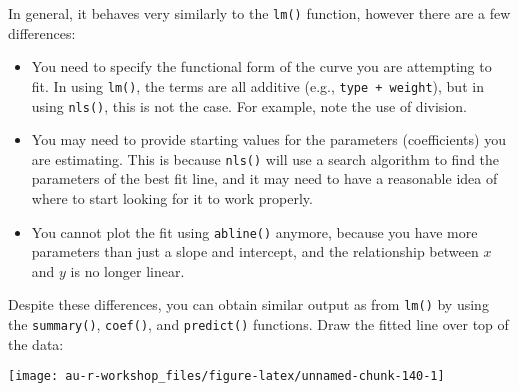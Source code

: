 \documentclass[]{book}
\newenvironment{Shaded}{\begin{snugshade}}{\end{snugshade}}
\newcommand{\KeywordTok}[1]{\textcolor[rgb]{0.13,0.29,0.53}{\textbf{#1}}}
\newcommand{\DataTypeTok}[1]{\textcolor[rgb]{0.13,0.29,0.53}{#1}}
\newcommand{\DecValTok}[1]{\textcolor[rgb]{0.00,0.00,0.81}{#1}}
\newcommand{\FloatTok}[1]{\textcolor[rgb]{0.00,0.00,0.81}{#1}}
\newcommand{\StringTok}[1]{\textcolor[rgb]{0.31,0.60,0.02}{#1}}
\newcommand{\OperatorTok}[1]{\textcolor[rgb]{0.81,0.36,0.00}{\textbf{#1}}}
\newcommand{\NormalTok}[1]{#1}
\providecommand{\tightlist}{%
  \setlength{\itemsep}{0pt}\setlength{\parskip}{0pt}}
\theoremstyle{definition}
\theoremstyle{definition}
\theoremstyle{definition}
\theoremstyle{remark}
\begin{document}
In general, it behaves very similarly to the \texttt{lm()} function,
however there are a few differences:

\begin{itemize}
\tightlist
\item
  You need to specify the functional form of the curve you are
  attempting to fit. In using \texttt{lm()}, the terms are all additive
  (e.g., \texttt{type\ +\ weight}), but in using \texttt{nls()}, this is
  not the case. For example, note the use of division.
\item
  You may need to provide starting values for the parameters
  (coefficients) you are estimating. This is because \texttt{nls()} will
  use a search algorithm to find the parameters of the best fit line,
  and it may need to have a reasonable idea of where to start looking
  for it to work properly.
\item
  You cannot plot the fit using \texttt{abline()} anymore, because you
  have more parameters than just a slope and intercept, and the
  relationship between \(x\) and \(y\) is no longer linear.
\end{itemize}

Despite these differences, you can obtain similar output as from
\texttt{lm()} by using the \texttt{summary()}, \texttt{coef()}, and
\texttt{predict()} functions. Draw the fitted line over top of the data:

\begin{Shaded}
\end{Shaded}

\begin{center}\texttt{[image: au-r-workshop\_files/figure-latex/unnamed-chunk-140-1]} \end{center}
\end{document}
